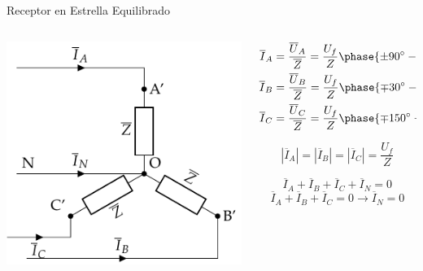 \documentclass[aspectratio=169, usenames,svgnames,dvipsnames]{beamer}
\begin{document}
\begin{frame}[label={sec:orgb023e42}]{Receptor en Estrella Equilibrado}
\begin{columns}
\begin{column}{0.5\columnwidth}
\begin{center}
\includegraphics[width=.9\linewidth]{../figs/EstrellaEquilibrado_Receptor.pdf}
\end{center}
\end{column}

\begin{column}{0.5\columnwidth}
\begin{align*}
  \overline{I}_A &= \frac{\overline{U}_A}{\overline{Z}} = \frac{U_f}{Z}\phase{\ang{\pm 90} - \theta} \\
  \overline{I}_B &= \frac{\overline{U}_B}{\overline{Z}} = \frac{U_f}{Z}\phase{\ang{\mp 30} - \theta}\\
  \overline{I}_C &= \frac{\overline{U}_C}{\overline{Z}} = \frac{U_f}{Z}\phase{\ang{\mp 150} - \theta}
\end{align*}


\[
  \boxed{|\overline{I}_A| = |\overline{I}_B| = |\overline{I}_C| = \frac{U_f}{Z}}
\]

\[
  \overline{I}_A  + \overline{I}_B + \overline{I}_C + \overline{I}_N = 0
\]
\[
   \overline{I}_A  + \overline{I}_B + \overline{I}_C  = 0 \rightarrow \boxed{\overline{I}_N = 0}
\]
\end{column}
\end{columns}
\end{frame}
\end{document}
